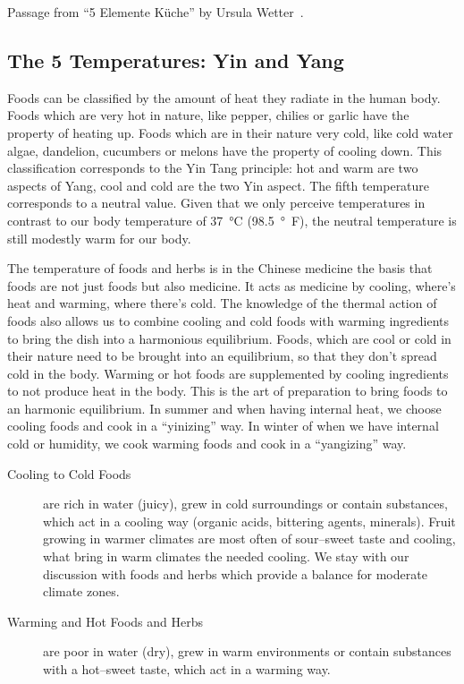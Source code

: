 \documentclass[../main.tex]{subfiles}
\begin{document}
Passage from ``5 Elemente K\"uche'' by Ursula Wetter~\cite{5Elemente}.

\subsection{The 5 Temperatures: Yin and Yang}

Foods can be classified by the amount of heat they radiate in the human body.
Foods which are very hot in nature, like pepper, chilies or garlic have the property of heating up.
Foods which are in their nature very cold, like cold water algae, dandelion, cucumbers or melons have the property of cooling down.
This classification corresponds to the Yin Tang principle: hot and warm are two aspects of Yang,
cool and cold are the two Yin aspect.
The fifth temperature corresponds to a neutral value.
Given that we only perceive temperatures in contrast to our body temperature of \SI{37}{\celsius} (\SI{98.5}{\degree\F}),
the neutral temperature is still modestly warm for our body.

The temperature of foods and herbs is in the Chinese medicine the basis that foods are not just foods but also medicine.
It acts as medicine by cooling, where's heat and warming, where there's cold.
The knowledge of the thermal action of foods also allows us to combine cooling and cold foods with warming ingredients to bring the dish into a
harmonious equilibrium.
Foods, which are cool or cold in their nature need to be brought into an equilibrium,
so that they don't spread cold in the body.
Warming or hot foods are supplemented by cooling ingredients to not produce heat in the body.
This is the art of preparation to bring foods to an harmonic equilibrium.
In summer and when having internal heat, we choose cooling foods and cook in a ``yinizing'' way.
In winter of when we have internal cold or humidity, we cook warming foods and cook in a ``yangizing'' way.

\begin{description}
\item[Cooling to Cold Foods] are rich in water (juicy), grew in cold surroundings or contain substances, which act in a cooling way (organic
  acids, bittering agents, minerals).
  Fruit growing in warmer climates are most often of sour--sweet taste and cooling, what bring in warm climates the needed cooling.
  We stay with our discussion with foods and herbs which provide a balance for moderate climate zones.
\item[Warming and Hot Foods and Herbs] are poor in water (dry), grew in warm environments or contain substances with a hot--sweet taste,
  which act in a warming way.
\end{description}
\end{document}
